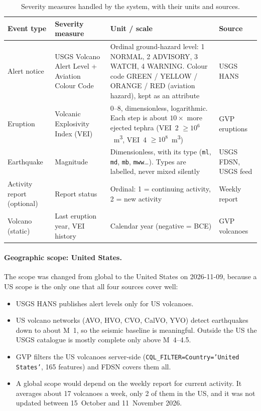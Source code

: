 \documentclass[11pt,a4paper]{article}
\begin{document}
\begin{table}[h]
\centering
\small
\setlength{\tabcolsep}{4pt}
\caption{Severity measures handled by the system, with their units and sources.}
\label{tab:severity}
\begin{tabular}{@{}L{2.4cm}L{3.0cm}L{7.2cm}L{2.6cm}@{}}
\toprule
\textbf{Event type} & \textbf{Severity measure} & \textbf{Unit / scale} & \textbf{Source} \\
\midrule
Alert notice & USGS Volcano Alert Level + Aviation Colour Code &
Ordinal ground-hazard level: 1 NORMAL, 2 ADVISORY, 3 WATCH, 4 WARNING. Colour code
GREEN / YELLOW / ORANGE / RED (aviation hazard), kept as an attribute &
USGS HANS \\
\addlinespace
Eruption & Volcanic Explosivity Index (VEI) &
0--8, dimensionless, logarithmic. Each step is about $10\times$ more ejected tephra
(VEI~2 $\geq 10^{6}$~m\textsuperscript{3}, VEI~4 $\geq 10^{8}$~m\textsuperscript{3}) &
GVP eruptions \\
\addlinespace
Earthquake & Magnitude &
Dimensionless, with its type (\texttt{ml}, \texttt{md}, \texttt{mb}, \texttt{mww}\dots).
Types are labelled, never mixed silently &
USGS FDSN, USGS feed \\
\addlinespace
Activity report (optional) & Report status &
Ordinal: 1 = continuing activity, 2 = new activity &
Weekly report \\
\addlinespace
Volcano (static) & Last eruption year, VEI history &
Calendar year (negative = BCE) & GVP volcanoes \\
\bottomrule
\end{tabular}
\end{table}

\paragraph{Geographic scope: United States.}
The scope was changed from global to the United States on 2026-11-09, because a US
scope is the only one that all four sources cover well:

\begin{itemize}
  \item USGS HANS publishes alert levels only for US volcanoes.
  \item US volcano networks (AVO, HVO, CVO, CalVO, YVO) detect earthquakes down to
  about M~1, so the seismic baseline is meaningful. Outside the US the USGS catalogue
  is mostly complete only above M~4--4.5.
  \item GVP filters the US volcanoes server-side
  (\texttt{CQL\_FILTER=Country='United States'}, 165 features) and FDSN covers them
  all.
  \item A global scope would depend on the weekly report for current activity. It
  averages about 17 volcanoes a week, only 2 of them in the US, and it was not updated
  between 15~October and 11~November 2026.
\end{itemize}
\end{document}

